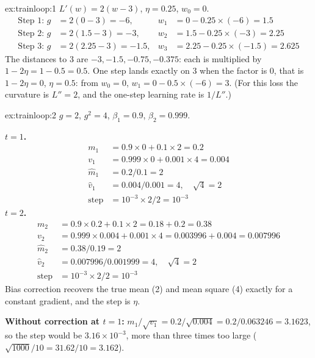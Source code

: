 
\begin{solution}{ex:trainloop:1}
$L'(w) = 2(w - 3)$, $\eta = 0.25$, $w_0 = 0$.
\begin{align*}
\text{Step 1: } g &= 2(0 - 3) = -6, & w_1 &= 0 - 0.25 \times (-6) = 1.5\\
\text{Step 2: } g &= 2(1.5 - 3) = -3, & w_2 &= 1.5 - 0.25 \times (-3) = 2.25\\
\text{Step 3: } g &= 2(2.25 - 3) = -1.5, & w_3 &= 2.25 - 0.25 \times (-1.5) = 2.625
\end{align*}
The distances to 3 are $-3, -1.5, -0.75, -0.375$: each is multiplied by $1 - 2\eta = 1 - 0.5 =
0.5$. One step lands exactly on 3 when the factor is 0, that is $1 - 2\eta = 0$, $\eta = 0.5$:
from $w_0 = 0$, $w_1 = 0 - 0.5 \times (-6) = 3$. (For this loss the curvature is $L'' = 2$, and
the one-step learning rate is $1/L''$.)
\end{solution}

\begin{solution}{ex:trainloop:2}
$g = 2$, $g^2 = 4$, $\beta_1 = 0.9$, $\beta_2 = 0.999$.

\textbf{$t = 1$.}
\begin{align*}
m_1 &= 0.9 \times 0 + 0.1 \times 2 = 0.2\\
v_1 &= 0.999 \times 0 + 0.001 \times 4 = 0.004\\
\hat{m}_1 &= 0.2 / 0.1 = 2\\
\hat{v}_1 &= 0.004 / 0.001 = 4, \quad \sqrt{4} = 2\\
\text{step} &= 10^{-3} \times 2/2 = 10^{-3}
\end{align*}
\textbf{$t = 2$.}
\begin{align*}
m_2 &= 0.9 \times 0.2 + 0.1 \times 2 = 0.18 + 0.2 = 0.38\\
v_2 &= 0.999 \times 0.004 + 0.001 \times 4 = 0.003996 + 0.004 = 0.007996\\
\hat{m}_2 &= 0.38 / 0.19 = 2\\
\hat{v}_2 &= 0.007996 / 0.001999 = 4, \quad \sqrt{4} = 2\\
\text{step} &= 10^{-3} \times 2/2 = 10^{-3}
\end{align*}
Bias correction recovers the true mean (2) and mean square (4) exactly for a constant gradient,
and the step is $\eta$.

\textbf{Without correction at $t = 1$:} $m_1/\sqrt{v_1} = 0.2/\sqrt{0.004} = 0.2/0.063246 =
3.1623$, so the step would be $3.16 \times 10^{-3}$, more than three times too large
($\sqrt{1000}/10 = 31.62/10 = 3.162$).
\end{solution}

